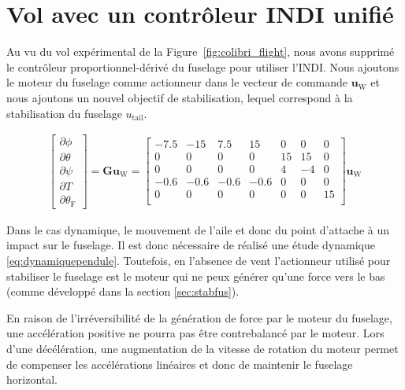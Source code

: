 {\color{blue}

\section{Vol avec un contrôleur INDI unifié}
    Au vu du vol expérimental de la Figure~\ref{fig:colibri_flight}, nous avons supprimé le contrôleur proportionnel-dérivé du fuselage pour utiliser l'INDI. Nous ajoutons le moteur du fuselage comme actionneur dans le vecteur de commande $\boldsymbol{u}_{\text{W}}$ et nous ajoutons un nouvel objectif de stabilisation, lequel correspond à la stabilisation du fuselage $u_{\text{tail}}$.

    \begin{align*}
        \begin{bmatrix}
        \partial \phi \\
        \partial \theta \\
        \partial \psi \\
        \partial T \\ 
        \partial \theta_{\text{F}}
        \end{bmatrix}\! =\! \boldsymbol{G} \boldsymbol{u}_{\text{W}} \!=\!
        \begin{bmatrix}
        -7.5 & -15 & 7.5 & 15 & 0 & 0 & 0\\
        0 & 0 & 0 & 0 & 15 & 15 & 0\\
        0 & 0 & 0 & 0 & 4 & -4 & 0 \\
        -0.6 & -0.6 & -0.6 & -0.6 & 0 & 0 & 0\\
        0 & 0 & 0 & 0 & 0 & 0 & 15 \\
        \end{bmatrix}
        \boldsymbol{u}_{\text{W}}
    \end{align*}


    Dans le cas dynamique, le mouvement de l'aile et donc du point d'attache à un impact sur le fuselage. Il est donc nécessaire de réalisé une étude dynamique \eqref{eq:dynamiquependule}. Toutefois, en l'absence de vent l'actionneur utilisé pour stabiliser le fuselage est le moteur qui ne peux générer qu'une force vers le bas (comme développé dans la section \ref{sec:stabfus}).
    \begin{remark}
        \label{rem:irréversibilité}
        En raison de l'irréversibilité de la génération de force par le moteur du fuselage, une accélération positive ne pourra pas être contrebalancé par le moteur. Lors d'une décélération, une augmentation de la vitesse de rotation du moteur permet de compenser les accélérations linéaires et donc de maintenir le fuselage horizontal.
    \end{remark}

}
